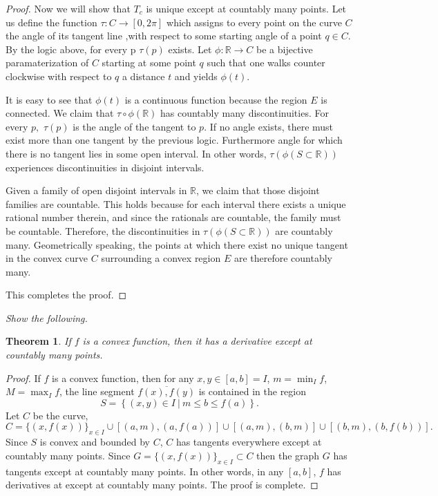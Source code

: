 \documentclass[letter]{article}
\newtheorem{theorem}{Theorem}
\newenvironment{menumerate}{%
  \edef\backupindent{\the\parindent}%
  \enumerate%
  \setlength{\parindent}{\backupindent}%
}{\endenumerate}
\begin{document}
\begin{menumerate}
\begin{menumerate}
\begin{proof}
						Now we will show that $T_c$ is unique except at countably many points. Let us define the function $\tau : C \to [0,2\pi]$ which assigns to every point on the curve $C$ the angle of its tangent line ,with respect to some starting angle of a point $q\in C$. By the logic above, for every p $\tau(p)$ exists. Let $\phi:\mathbb{R}\to C$ be a bijective paramaterization of $C$ starting at some point $q$ such that one walks counter clockwise with respect to $q$ a distance $t$ and yields $\phi(t).$

						It is easy to see that $\phi(t)$ is a continuous function because the region $E$ is connected. We claim that $\tau \circ \phi (\mathbb{R})$ has countably many discontinuities. For every $p,$ $\tau(p)$ is the angle of the tangent to $p.$ If no angle exists, there must exist more than one tangent by the previous logic. Furthermore angle for which there is no tangent lies in some open interval. In other words, $\tau(\phi(S \subset \mathbb{R}))$ experiences discontinuities in disjoint intervals.

						Given a family of open disjoint intervals in $\mathbb{R}$, we claim that those disjoint families are countable. This holds because for each interval there exists a unique rational number therein, and since the rationals are countable, the family must be countable. Therefore, the discontinuities in  $\tau(\phi(S \subset \mathbb{R}))$ are countably many. Geometrically speaking, the points at which there exist no unique tangent in the convex curve $C$ surrounding a convex region $E$ are therefore countably many.

						This completes the proof.
					\end{proof} 

					\item\textit{Show the following.}
					\begin{theorem}
						If $f$ is a convex function, then it has a derivative except at countably many points.
					\end{theorem}

					\begin{proof}
						If $f$ is a convex function, then for any $x,y \in [a,b]=I$, $m = \min_I f$, $M= \max_I f$, the line segment $\overline{f(x),f(y)}$ is contained in the region $$S = \left\{(x,y)\in I \ |\ m \leq b \leq f(a)\right\}.$$ Let $C$ be the curve, $C = \{(x,f(x))\}_{x\in I} \cup [(a,m),(a,f(a))] \cup [(a,m),(b,m)] \cup [(b,m), (b,f(b))].$ Since $S$ is convex and bounded by $C$, $C$ has tangents everywhere except at countably many points. Since $G = \{(x,f(x))\}_{x\in I}\subset C$ then the graph $G$ has tangents except at countably many points. In other words, in any $[a,b]$, $f$ has derivatives at except at countably many points. The proof is complete.
					\end{proof}
			\end{menumerate} 


\end{menumerate}
\end{document}
